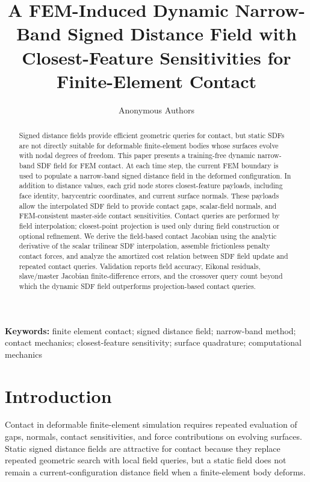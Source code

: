 \documentclass[11pt]{article}
\title{A FEM-Induced Dynamic Narrow-Band Signed Distance Field with Closest-Feature Sensitivities for Finite-Element Contact}
\author{Anonymous Authors}
\date{}
\begin{document}
\maketitle

\begin{abstract}
Signed distance fields provide efficient geometric queries for contact, but static SDFs are not directly suitable for deformable finite-element bodies whose surfaces evolve with nodal degrees of freedom. This paper presents a training-free dynamic narrow-band SDF field for FEM contact. At each time step, the current FEM boundary is used to populate a narrow-band signed distance field in the deformed configuration. In addition to distance values, each grid node stores closest-feature payloads, including face identity, barycentric coordinates, and current surface normals. These payloads allow the interpolated SDF field to provide contact gaps, scalar-field normals, and FEM-consistent master-side contact sensitivities. Contact queries are performed by field interpolation; closest-point projection is used only during field construction or optional refinement. We derive the field-based contact Jacobian using the analytic derivative of the scalar trilinear SDF interpolation, assemble frictionless penalty contact forces, and analyze the amortized cost relation between SDF field update and repeated contact queries. Validation reports field accuracy, Eikonal residuals, slave/master Jacobian finite-difference errors, and the crossover query count beyond which the dynamic SDF field outperforms projection-based contact queries.
\end{abstract}

\noindent\textbf{Keywords:}
finite element contact; signed distance field; narrow-band method; contact mechanics; closest-feature sensitivity; surface quadrature; computational mechanics

\section{Introduction}

Contact in deformable finite-element simulation requires repeated evaluation of gaps, normals, contact sensitivities, and force contributions on evolving surfaces. Static signed distance fields are attractive for contact because they replace repeated geometric search with local field queries, but a static field does not remain a current-configuration distance field when a finite-element body deforms.
\end{document}
